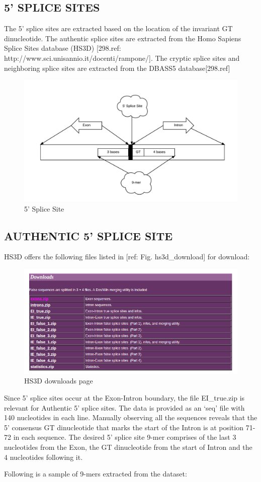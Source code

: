 \documentclass[12pt,a4paper]{article}
\begin{document}
    \subsection{5' SPLICE SITES}
    The 5’ splice sites are extracted based on the location of the invariant GT dinucleotide. The authentic splice sites are extracted from the Homo Sapiens Splice Sites database (HS3D) [298.ref: http://www.sci.unisannio.it/docenti/rampone/]. The cryptic splice sites and neighboring splice sites are extracted from the DBASS5 database[298.ref]
   	\begin{figure}[h]
   		\includegraphics[width=\textwidth]{fiveprime}
   		\caption{5' Splice Site}
   		\centering
   	\end{figure}

	\subsection{AUTHENTIC 5' SPLICE SITE}
	HS3D offers the following files listed in [ref: Fig. hs3d\_download] for download:
   	\begin{figure}[H]
   		\includegraphics[width=\textwidth]{"hs3d_download"}
   		\caption{HS3D downloads page}
   		\centering
   	\end{figure}
	\par Since 5’ splice sites occur at the Exon-Intron boundary, the file EI\_true.zip is relevant for Authentic 5’ splice sites. The data is provided as an ‘seq’ file with 140 nucleotides in each line. Manually observing all the sequences reveals that the 5’ consensus GT dinucleotide that marks the start of the Intron is at position 71-72 in each sequence. The desired 5’ splice site 9-mer comprises of the last 3 nucleotides from the Exon, the GT dinucleotide from the start of Intron and the 4 nucleotides following it. \par
	Following is a sample of 9-mers extracted from the dataset:
	
\end{document}
